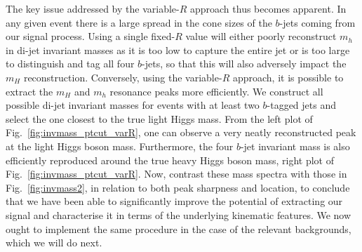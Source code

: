 \documentclass[12pt]{article}
\begin{document}
The key issue addressed by the variable-$R$ approach  thus becomes apparent. In any given event there is a
large spread in the cone sizes of the $b$-jets coming from our signal process. Using a
single fixed-$R$ value will either poorly reconstruct $m_h$ in di-jet invariant masses as it is too
low to capture the entire jet or is too large to distinguish and tag all four $b$-jets, so that this will also adversely impact the $m_H$ reconstruction. Conversely, using the variable-$R$ approach, it is possible to
extract the $m_H$ and $m_h$ resonance peaks  more efficiently. We construct all
possible di-jet invariant masses for events with at least two $b$-tagged jets and select
the one closest to the true light Higgs mass. From the left plot of Fig.~\ref{fig:invmass_ptcut_varR},
one can observe a very neatly reconstructed peak at the light Higgs boson mass. Furthermore, the four $b$-jet invariant mass
is also efficiently reproduced  around the true heavy Higgs boson mass, right plot of Fig.~\ref{fig:invmass_ptcut_varR}. Now, contrast these mass spectra with those in Fig.~\ref{fig:invmass2},  in relation to  both peak sharpness and location,
to conclude that we have been able to significantly improve the potential of extracting our signal and characterise it in terms of the underlying kinematic features. We now ought to implement the same procedure in the case of the relevant backgrounds, which we will do next.


\end{document}
